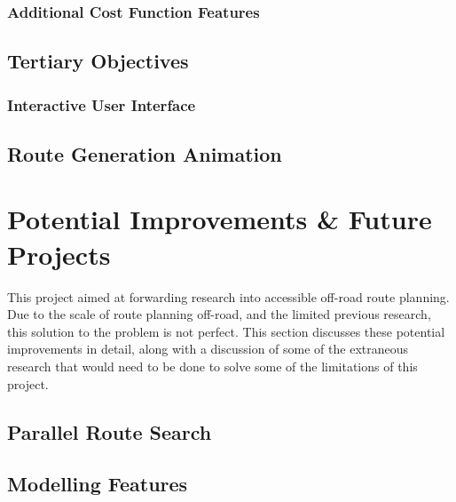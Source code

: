 \documentclass[12pt]{article}
\begin{document}
\subsubsection{Additional Cost Function Features}

\subsection{Tertiary Objectives}

\subsubsection{Interactive User Interface}

\subsection{Route Generation Animation}


\section{Potential Improvements \& Future Projects}

This project aimed at forwarding research into accessible off-road route planning. Due to the scale of route planning off-road, and the limited previous research, this solution to the problem is not perfect. This section discusses these potential improvements in detail, along with a discussion of some of the extraneous research that would need to be done to solve some of the limitations of this project.

\subsection{Parallel Route Search}


\subsection{Modelling Features}
\end{document}
